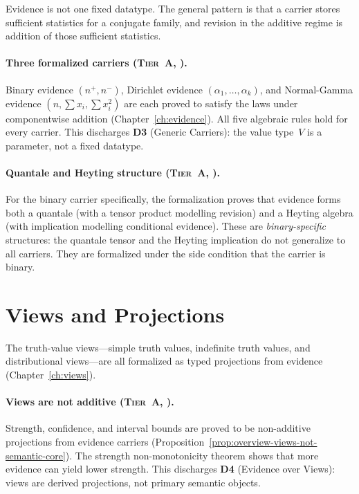 Evidence is not one fixed datatype.  The general pattern is that a
carrier stores sufficient statistics for a conjugate family, and revision
in the additive regime is addition of those sufficient statistics.

\paragraph{Three formalized carriers (\textsc{Tier~A}, \claimCore{}).}
Binary evidence $(n^+, n^-)$, Dirichlet evidence
$(\alpha_1, \ldots, \alpha_k)$, and Normal-Gamma evidence
$(n, \sum x_i, \sum x_i^2)$ are each proved to satisfy the
 laws under componentwise addition
(Chapter~\ref{ch:evidence}).  All five algebraic rules hold for every
carrier.  This discharges \textbf{D3} (Generic Carriers): the value
type~$V$ is a parameter, not a fixed datatype.

\paragraph{Quantale and Heyting structure
  (\textsc{Tier~A}, \claimConditional{}).}
For the binary carrier specifically, the formalization proves that
evidence forms both a quantale (with a tensor product modelling revision)
and a Heyting algebra (with implication modelling conditional evidence).
These are \emph{binary-specific} structures: the quantale tensor and the
Heyting implication do not generalize to all carriers.  They are
formalized under the side condition that the carrier is binary.


\section{Views and Projections}
\label{sec:covers-views}

The truth-value views---simple truth values, indefinite truth values,
and distributional views---are all formalized as typed projections from
evidence (Chapter~\ref{ch:views}).

\paragraph{Views are not additive (\textsc{Tier~A}, \claimCore{}).}
Strength, confidence, and interval bounds are proved to be non-additive
projections from evidence carriers
(Proposition~\ref{prop:overview-views-not-semantic-core}).  The strength
non-monotonicity theorem shows that more evidence can yield lower
strength.  This discharges \textbf{D4} (Evidence over Views): views are
derived projections, not primary semantic objects.

